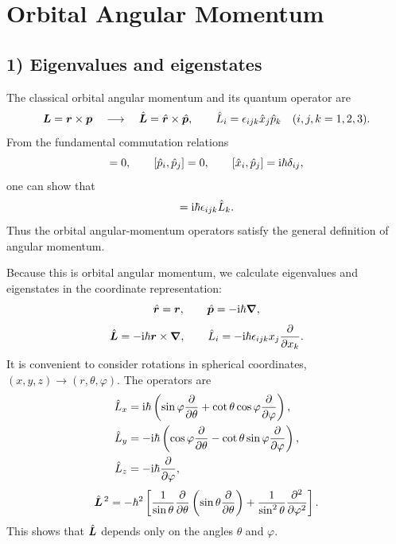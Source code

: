 \section{Orbital Angular Momentum}
\subsection*{1) Eigenvalues and eigenstates}
The classical orbital angular momentum and its quantum operator are
\begin{equation}
\bm{L}=\bm{r}\times\bm{p}\quad\longrightarrow\quad
\hat{\bm{L}}=\hat{\bm{r}}\times\hat{\bm{p}},\qquad
\hat{L}_i=\epsilon_{ijk}\hat{x}_j\hat{p}_k\quad (i,j,k=1,2,3).
\end{equation}
From the fundamental commutation relations
\begin{equation}
[\op x_i,\op x_j]=0,\qquad[\op p_i,\op p_j]=0,\qquad
[\op x_i,\op p_j]=\ii\hbar\delta_{ij},
\end{equation}
one can show that
\begin{equation}
[\op L_i,\op L_j]=\ii\hbar\epsilon_{ijk}\op L_k.
\end{equation}
Thus the orbital angular-momentum operators satisfy the general definition of angular momentum.

Because this is orbital angular momentum, we calculate eigenvalues and eigenstates in the coordinate representation:
\begin{equation}
\hat{\bm{r}}=\bm{r},\qquad\hat{\bm{p}}=-\mathrm{i}\hbar\bm{\nabla},
\end{equation}
\begin{equation}
\hat{\bm{L}}=-\mathrm{i}\hbar\bm{r}\times\bm{\nabla},\qquad
\hat{L}_i=-\mathrm{i}\hbar\epsilon_{ijk}x_j\frac\partial{\partial x_k}.
\end{equation}
It is convenient to consider rotations in spherical coordinates, $(x,y,z)\to(r,\theta,\varphi)$. The operators are
\begin{equation}
\begin{aligned}
\hat{L}_x&=\mathrm{i}\hbar\left(\sin\varphi\frac\partial{\partial\theta}
+\cot\theta\cos\varphi\frac\partial{\partial\varphi}\right),\\
\hat{L}_y&=-\mathrm{i}\hbar\left(\cos\varphi\frac\partial{\partial\theta}
-\cot\theta\sin\varphi\frac\partial{\partial\varphi}\right),\\
\hat{L}_z&=-\mathrm{i}\hbar\frac\partial{\partial\varphi},
\end{aligned}
\end{equation}
\begin{equation}
\hat{\bm{L}}^{\,2}=-\hbar^2\left[
\frac1{\sin\theta}\frac\partial{\partial\theta}
\left(\sin\theta\frac\partial{\partial\theta}\right)
+\frac1{\sin^2\theta}\frac{\partial^2}{\partial\varphi^2}\right].
\end{equation}
This shows that $\hat{\bm{L}}$ depends only on the angles $\theta$ and $\varphi$.

